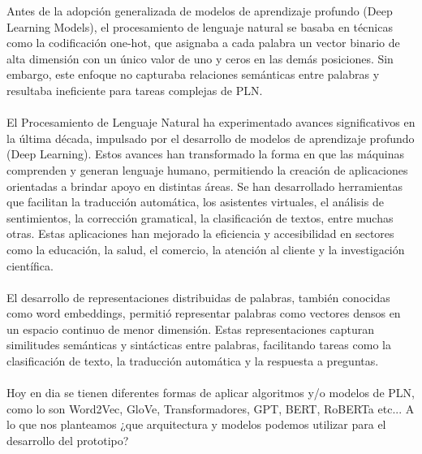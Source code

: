 Antes de la adopción generalizada de modelos de aprendizaje profundo (Deep Learning Models), el procesamiento de lenguaje natural se basaba en técnicas como la codificación one-hot, que asignaba a cada palabra un vector binario de alta dimensión con un único valor de uno y ceros en las demás posiciones. Sin embargo, este enfoque no capturaba relaciones semánticas entre palabras y resultaba ineficiente para tareas complejas de PLN.
\\
\\
El Procesamiento de Lenguaje Natural ha experimentado avances significativos en la última década, impulsado por el desarrollo de modelos de aprendizaje profundo (Deep Learning). Estos avances han transformado la forma en que las máquinas comprenden y generan lenguaje humano, permitiendo la creación de aplicaciones orientadas a brindar apoyo en distintas áreas. Se han desarrollado herramientas que facilitan la traducción automática, los asistentes virtuales, el análisis de sentimientos, la corrección gramatical, la clasificación de textos, entre muchas otras. Estas aplicaciones han mejorado la eficiencia y accesibilidad en sectores como la educación, la salud, el comercio, la atención al cliente y la investigación científica.
\\
\\
El desarrollo de representaciones distribuidas de palabras, también conocidas como word embeddings, permitió representar palabras como vectores densos en un espacio continuo de menor dimensión. Estas representaciones capturan similitudes semánticas y sintácticas entre palabras, facilitando tareas como la clasificación de texto, la traducción automática y la respuesta a preguntas.
\\
\\
Hoy en dia se tienen diferentes formas de aplicar algoritmos y/o modelos de PLN, como lo son Word2Vec, GloVe, Transformadores, GPT, BERT, RoBERTa etc... A lo que nos planteamos ¿que arquitectura y modelos podemos utilizar para el desarrollo del prototipo?

